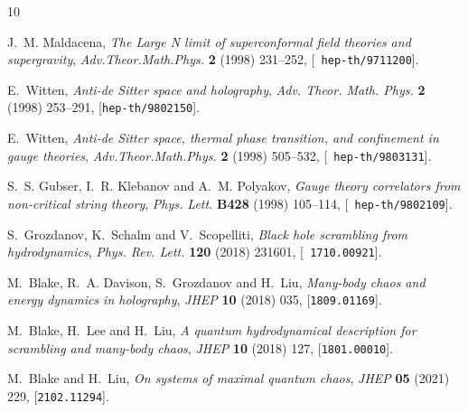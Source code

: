 \documentclass[11pt,a4paper]{article}
\begin{document}
\providecommand{\href}[2]{#2}\begingroup\raggedright\begin{thebibliography}{10}

J.~M. Maldacena, \emph{{The Large N limit of superconformal field theories and
  supergravity}}, \href{http://dx.doi.org/10.1023/A:1026654312961,
  10.1023/A:1026654312961}{\emph{Adv.Theor.Math.Phys.} {\bf 2} (1998)
  231--252}, [\href{http://arxiv.org/abs/hep-th/9711200}{{\tt
  hep-th/9711200}}].

E.~Witten, \emph{{Anti-de Sitter space and holography}}, {\emph{Adv. Theor.
  Math. Phys.} {\bf 2} (1998) 253--291},
  [\href{http://arxiv.org/abs/hep-th/9802150}{{\tt hep-th/9802150}}].

E.~Witten, \emph{{Anti-de Sitter space, thermal phase transition, and
  confinement in gauge theories}}, {\emph{Adv.Theor.Math.Phys.} {\bf 2} (1998)
  505--532}, [\href{http://arxiv.org/abs/hep-th/9803131}{{\tt
  hep-th/9803131}}].

S.~S. Gubser, I.~R. Klebanov and A.~M. Polyakov, \emph{{Gauge theory
  correlators from non-critical string theory}},
  \href{http://dx.doi.org/10.1016/S0370-2693(98)00377-3}{\emph{Phys. Lett.}
  {\bf B428} (1998) 105--114}, [\href{http://arxiv.org/abs/hep-th/9802109}{{\tt
  hep-th/9802109}}].

S.~Grozdanov, K.~Schalm and V.~Scopelliti, \emph{{Black hole scrambling from
  hydrodynamics}},
  \href{http://dx.doi.org/10.1103/PhysRevLett.120.231601}{\emph{Phys. Rev.
  Lett.} {\bf 120} (2018) 231601}, [\href{http://arxiv.org/abs/1710.00921}{{\tt
  1710.00921}}].

M.~Blake, R.~A. Davison, S.~Grozdanov and H.~Liu, \emph{{Many-body chaos and
  energy dynamics in holography}},
  \href{http://dx.doi.org/10.1007/JHEP10(2018)035}{\emph{JHEP} {\bf 10} (2018)
  035}, [\href{http://arxiv.org/abs/1809.01169}{{\tt 1809.01169}}].

M.~Blake, H.~Lee and H.~Liu, \emph{{A quantum hydrodynamical description for
  scrambling and many-body chaos}},
  \href{http://dx.doi.org/10.1007/JHEP10(2018)127}{\emph{JHEP} {\bf 10} (2018)
  127}, [\href{http://arxiv.org/abs/1801.00010}{{\tt 1801.00010}}].

M.~Blake and H.~Liu, \emph{{On systems of maximal quantum chaos}},
  \href{http://dx.doi.org/10.1007/JHEP05(2021)229}{\emph{JHEP} {\bf 05} (2021)
  229}, [\href{http://arxiv.org/abs/2102.11294}{{\tt 2102.11294}}].


\end{thebibliography}
\end{document}
